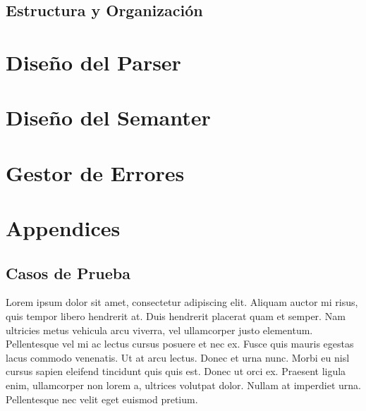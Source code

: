 \documentclass[a4paper]{CSMakotoTechnicalReport}
\begin{document}
    \subsection{Estructura y Organización}

    \section{Diseño del Parser}
    \section{Diseño del Semanter}
    \section{Gestor de Errores}


\newpage

\section*{Appendices}

\begin{appendices}

    \section{Casos de Prueba}

    Lorem ipsum dolor sit amet, consectetur adipiscing elit. Aliquam auctor mi risus, quis tempor libero hendrerit at. Duis hendrerit placerat quam et semper. Nam ultricies metus vehicula arcu viverra, vel ullamcorper justo elementum. Pellentesque vel mi ac lectus cursus posuere et nec ex. Fusce quis mauris egestas lacus commodo venenatis. Ut at arcu lectus. Donec et urna nunc. Morbi eu nisl cursus sapien eleifend tincidunt quis quis est. Donec ut orci ex. Praesent ligula enim, ullamcorper non lorem a, ultrices volutpat dolor. Nullam at imperdiet urna. Pellentesque nec velit eget euismod pretium.

\end{appendices}

\end{document}
